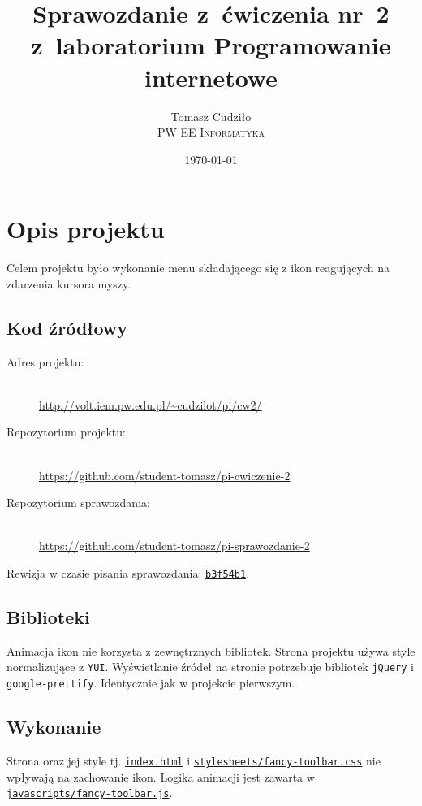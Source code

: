 \documentclass[10pt,a4paper]{article}
\newcommand{\f}[1]{\texttt{#1}}
\begin{document}
\title{
  Sprawozdanie z~ćwiczenia nr~2\\z~laboratorium Programowanie internetowe
}
\author{
  Tomasz Cudziło\\
  \textsc{PW EE Informatyka}\\[10pt]
}
\date{\today}
\maketitle



\section{Opis projektu}

Celem projektu było wykonanie menu składającego się z ikon reagujących na
zdarzenia kursora myszy.

\subsection{Kod źródłowy}
\begin{description}
  \item[Adres projektu:] \hfill \\
  \url{http://volt.iem.pw.edu.pl/~cudzilot/pi/cw2/}
  \item[Repozytorium projektu:] \hfill \\
  \url{https://github.com/student-tomasz/pi-cwiczenie-2}
  \item[Repozytorium sprawozdania:] \hfill \\
  \url{https://github.com/student-tomasz/pi-sprawozdanie-2}
\end{description}
Rewizja w czasie pisania sprawozdania:
\href{https://github.com/student-tomasz/pi-cwiczenie-2/tree/b3f54b187e99c161f7a6780524f504c9fd1b00dd}{\f{b3f54b1}}.

\subsection{Biblioteki}

Animacja ikon nie korzysta z zewnętrznych bibliotek. Strona projektu używa style
normalizujące z \f{YUI}. Wyświetlanie źródeł na stronie potrzebuje bibliotek
\f{jQuery} i \f{google-prettify}. Identycznie jak w projekcie pierwszym.

\subsection{Wykonanie}
Strona oraz jej style tj.
\href{https://github.com/student-tomasz/pi-cwiczenie-2/tree/b3f54b187e99c161f7a6780524f504c9fd1b00dd/index.html}{\f{index.html}}
i
\href{https://github.com/student-tomasz/pi-cwiczenie-2/tree/b3f54b187e99c161f7a6780524f504c9fd1b00dd/stylesheets/fancy-toolbar.css}{\f{stylesheets/fancy-toolbar.css}}
nie wpływają na zachowanie ikon. Logika animacji jest zawarta w
\href{https://github.com/student-tomasz/pi-cwiczenie-2/tree/b3f54b187e99c161f7a6780524f504c9fd1b00dd/javascripts/fancy-toolbar.js}{\f{javascripts/fancy-toolbar.js}}.
\end{document}
